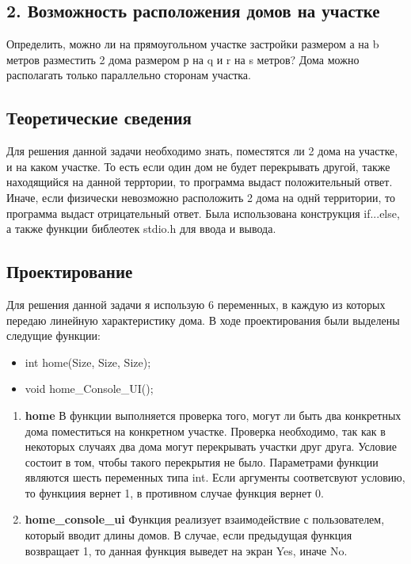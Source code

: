 \documentclass[12pt,a4paper]{report}
\begin{document}
\subsection{2. Возможность расположения домов на участке}
\hspace{\parindent}
Определить, можно ли на прямоугольном участке застройки размером а на b метров разместить 2 дома размером р на q и r на s метров? Дома можно располагать только параллельно сторонам участка.

\subsection{Теоретические сведения}
\hspace{\parindent}
Для решения данной задачи необходимо знать, поместятся ли 2 дома на участке, и на каком участке. То есть если один дом не будет перекрывать другой, также находящийся на данной терртории, то программа выдаст положительный ответ. Иначе, если физически невозможно расположить 2 дома на однй территории, то программа выдаст отрицательный ответ. Была использована конструкция if...else, а также  функции библеотек stdio.h для ввода и вывода.

\subsection{Проектирование}
\hspace{\parindent}
Для решения данной задачи я использую 6 переменных, в каждую из которых передаю линейную характеристику дома.
	В ходе проектирования были выделены следущие функции:
\begin{itemize}
\item int home(Size, Size, Size);
\item void home\_Console\_UI();
\end{itemize}
\begin{enumerate}
	\item \textbf{home}
	В  функции выполняется проверка того, могут ли быть два конкретных дома поместиться на конкретном  участке. Проверка необходимо, так как в некоторых случаях два дома могут перекрывать участки друг друга. Условие состоит в том, чтобы такого перекрытия не было.
	Параметрами функции являются шесть переменных типа int. Если аргументы соответсвуют условию, то функциия вернет 1, в противном случае функция вернет 0.
		\item \textbf{home\_console\_ui}
	Функция реализует взаимодействие с пользователем, который вводит длины домов. В случае, если предыдущая функция возвращает 1, то данная функция выведет на экран Yes, иначе No.
\end{enumerate}
\end{document}

